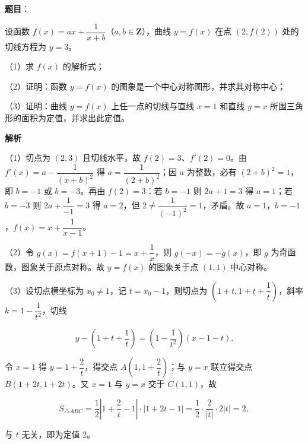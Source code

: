 \begin{answer}

\textbf{题目}：

设函数 $f(x)=ax+\dfrac1{x+b}$（$a,b\in\mathbf Z$），曲线 $y=f(x)$ 在点 $(2,f(2))$ 处的切线方程为 $y=3$。

（1）求 $f(x)$ 的解析式；

（2）证明：函数 $y=f(x)$ 的图象是一个中心对称图形，并求其对称中心；

（3）证明：曲线 $y=f(x)$ 上任一点的切线与直线 $x=1$ 和直线 $y=x$ 所围三角形的面积为定值，并求出此定值。

\textbf{解析}

（1）切点为 $(2,3)$ 且切线水平，故 $f(2)=3$、$f'(2)=0$。由 $f'(x)=a-\dfrac1{(x+b)^2}$ 得 $a=\dfrac1{(2+b)^2}$；因 $a$ 为整数，必有 $(2+b)^2=1$，即 $b=-1$ 或 $b=-3$。再由 $f(2)=3$：若 $b=-1$ 则 $2a+1=3$ 得 $a=1$；若 $b=-3$ 则 $2a+\dfrac1{-1}=3$ 得 $a=2$，但 $2\neq\dfrac1{(-1)^2}=1$，矛盾。故 $a=1$，$b=-1$，$f(x)=x+\dfrac1{x-1}$。

（2）令 $g(x)=f(x+1)-1=x+\dfrac1x$，则 $g(-x)=-g(x)$，即 $g$ 为奇函数，图象关于原点对称。故 $y=f(x)$ 的图象关于点 $(1,1)$ 中心对称。

（3）设切点横坐标为 $x_0\neq1$，记 $t=x_0-1$，则切点为 $\left(1+t,1+t+\dfrac1t\right)$，斜率 $k=1-\dfrac1{t^2}$，切线

\nopagebreak[4]
\[y-\left(1+t+\frac1t\right)=\left(1-\frac1{t^2}\right)(x-1-t).\]

令 $x=1$ 得 $y=1+\dfrac2t$，得交点 $A\left(1,1+\dfrac2t\right)$；与 $y=x$ 联立得交点 $B(1+2t,1+2t)$。又 $x=1$ 与 $y=x$ 交于 $C(1,1)$，故

\nopagebreak[4]
\[S_{\triangle ABC}=\frac12\left|1+\frac2t-1\right|\cdot\left|1+2t-1\right|=\frac12\cdot\frac2{|t|}\cdot2|t|=2,\]

与 $t$ 无关，即为定值 $2$。


\end{answer}
